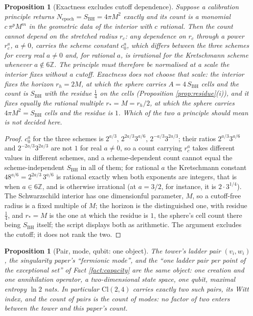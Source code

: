 \documentclass[11pt]{article}
\newtheorem{proposition}[theorem]{Proposition}
\theoremstyle{definition}
\newcommand{\Cl}{\mathrm{Cl}}
\newcommand{\SBH}{S_{\mathrm{BH}}}
\begin{document}
\begin{proposition}[Exactness excludes cutoff dependence]\label{prop:exactnorm}
Suppose a calibration principle returns $N_{\mathrm{epoch}} = \SBH = 4\pi M^2$ exactly and its count is a monomial $c\,\pi^p M^m$ in the geometric data of the interior with $c$ rational. Then the count cannot depend on the stretched radius $r_c$: any dependence on $r_c$ through a power $r_c^a$, $a \neq 0$, carries the scheme constant $c_0^a$, which differs between the three schemes for every real $a \neq 0$ and, for rational $a$, is irrational for the Kretschmann scheme whenever $a \notin 6\mathbb{Z}$. The principle must therefore be normalised at a scale the interior fixes without a cutoff. Exactness does not choose that scale: the interior fixes the horizon $r_h = 2M$, at which the sphere carries $A = 4\,\SBH$ cells and the count is $\SBH$ with the residue $\tfrac14$ on the cells (Proposition \ref{prop:residue}(i)), and it fixes equally the rational multiple $r_* = M = r_h/2$, at which the sphere carries $4\pi M^2 = \SBH$ cells and the residue is $1$. Which of the two a principle should mean is not decided here.
\end{proposition}

\begin{proof}
$c_0^a$ for the three schemes is $2^{a/3}$, $2^{2a/3}3^{a/6}$, $2^{-a/3}3^{2a/3}$; their ratios $2^{a/3}3^{a/6}$ and $2^{-2a/3}3^{2a/3}$ are not $1$ for real $a \neq 0$, so a count carrying $r_c^a$ takes different values in different schemes, and a scheme-dependent count cannot equal the scheme-independent $\SBH$ in all of them; for rational $a$ the Kretschmann constant $48^{a/6} = 2^{2a/3}\,3^{a/6}$ is rational exactly when both exponents are integers, that is when $a \in 6\mathbb{Z}$, and is otherwise irrational (at $a = 3/2$, for instance, it is $2\cdot 3^{1/4}$). The Schwarzschild interior has one dimensionful parameter, $M$, so a cutoff-free radius is a fixed multiple of $M$; the horizon is the distinguished one, with residue $\tfrac14$, and $r_* = M$ is the one at which the residue is $1$, the sphere's cell count there being $\SBH$ itself; the script displays both as arithmetic. The argument excludes the cutoff; it does not rank the two.
\end{proof}

\begin{proposition}[Pair, mode, qubit: one object]\label{prop:pair}
The tower's ladder pair $(v_i, w_i)$, the singularity paper's ``fermionic mode'', and the ``one ladder pair per point of the exceptional set'' of Fact \ref{fact:capacity} are the same object: one creation and one annihilation operator, a two-dimensional state space, one qubit, maximal entropy $\ln 2$ nats. In particular $\Cl(2,4)$ carries exactly two such pairs, its Witt index, and the count of pairs is the count of modes: no factor of two enters between the tower and this paper's count.
\end{proposition}
\end{document}
